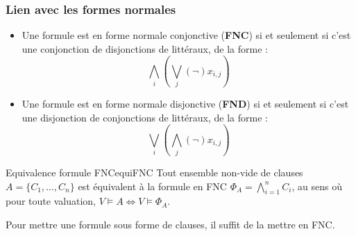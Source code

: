\subsubsection{Lien avec les formes normales}
\begin{itemize}[label=\textbullet]
    \item Une formule est en forme normale conjonctive (\textbf{FNC}) si et seulement si c'est une conjonction de disjonctions de littéraux, de la forme :
    \begin{equation*}
        \bigwedge_i(\bigvee_j(\neg)x_{i,j})
    \end{equation*}
    \item Une formule est en forme normale disjonctive (\textbf{FND}) si et seulement si c'est une disjonction de conjonctions de littéraux, de la forme :
    \begin{equation*}
        \bigvee_i(\bigwedge_j(\neg)x_{i,j})
    \end{equation*}
\end{itemize}
\begin{lemma}{Equivalence formule FNC}{equiFNC}
    Tout ensemble non-vide de clauses $A = \{C_1,\dots,C_n\}$ est équivalent à la formule en FNC $\Phi_A = \bigwedge_{i=1}^{n} C_i$, au sens où pour toute valuation, $V \models A \Leftrightarrow V \models \Phi_A$.
\end{lemma}
\begin{remark}
    Pour mettre une formule sous forme de clauses, il suffit de la mettre en FNC.
\end{remark}
